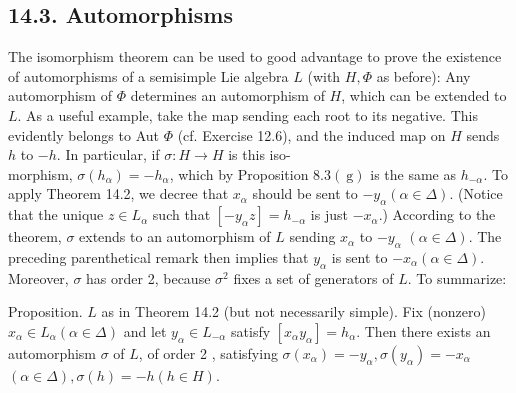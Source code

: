 \documentclass[10pt]{article}
\begin{document}
\subsection*{14.3. Automorphisms}
The isomorphism theorem can be used to good advantage to prove the existence of automorphisms of a semisimple Lie algebra $L$ (with $H, \Phi$ as before): Any automorphism of $\Phi$ determines an automorphism of $H$, which can be extended to $L$. As a useful example, take the map sending each root to its negative. This evidently belongs to Aut $\Phi$ (cf. Exercise 12.6), and the induced map on $H$ sends $h$ to $-h$. In particular, if $\sigma: H \rightarrow H$ is this iso-\\
morphism, $\sigma\left(h_{\alpha}\right)=-h_{\alpha}$, which by Proposition $8.3(\mathrm{~g})$ is the same as $h_{-\alpha}$. To apply Theorem 14.2, we decree that $x_{\alpha}$ should be sent to $-y_{\alpha}(\alpha \in \Delta)$. (Notice that the unique $z \in L_{\alpha}$ such that $\left[-y_{\alpha} z\right]=h_{-\alpha}$ is just $-x_{\alpha}$.) According to the theorem, $\sigma$ extends to an automorphism of $L$ sending $x_{\alpha}$ to $-y_{\alpha}$ $(\alpha \in \Delta)$. The preceding parenthetical remark then implies that $y_{\alpha}$ is sent to $-x_{\alpha}(\alpha \in \Delta)$. Moreover, $\sigma$ has order 2, because $\sigma^{2}$ fixes a set of generators of $L$. To summarize:

Proposition. $L$ as in Theorem 14.2 (but not necessarily simple). Fix (nonzero) $x_{\alpha} \in L_{\alpha}(\alpha \in \Delta)$ and let $y_{\alpha} \in L_{-\alpha}$ satisfy $\left[x_{\alpha} y_{\alpha}\right]=h_{\alpha}$. Then there exists an automorphism $\sigma$ of $L$, of order 2 , satisfying $\sigma\left(x_{\alpha}\right)=-y_{\alpha}, \sigma\left(y_{\alpha}\right)=-x_{\alpha}$ $(\alpha \in \Delta), \sigma(h)=-h(h \in H)$.
\end{document}
